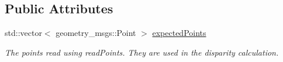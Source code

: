 \subsection*{Public Attributes}
\begin{DoxyCompactItemize}
\item 
\hypertarget{classGameModel_a44fed97d34754440dc38e8e21d780f80}{std\-::vector$<$ geometry\-\_\-msgs\-::\-Point $>$ \hyperlink{classGameModel_a44fed97d34754440dc38e8e21d780f80}{expected\-Points}}\label{classGameModel_a44fed97d34754440dc38e8e21d780f80}

\begin{DoxyCompactList}\small\item\em The points read using read\-Points. They are used in the disparity calculation. \end{DoxyCompactList}\end{DoxyCompactItemize}
